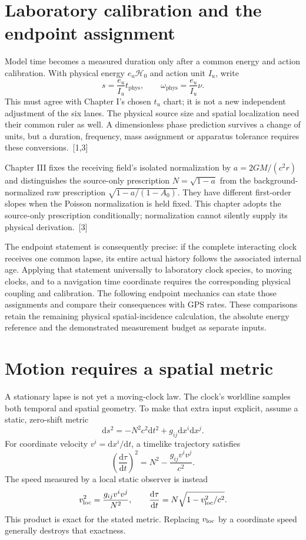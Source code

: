 \documentclass[10pt,twocolumn,letterpaper]{article}
\newcommand{\dd}{\mathrm{d}}
\begin{document}









\section{Laboratory calibration and the endpoint assignment}
Model time becomes a measured duration only after a common energy and action calibration. With physical energy $e_u\mathcal H_0$ and action unit $I_u$, write
\[
 s=\frac{e_u}{I_u}t_{\mathrm{phys}},\qquad
 \omega_{\mathrm{phys}}=\frac{e_u}{I_u}\nu.
\]
This must agree with Chapter I's chosen $t_u$ chart; it is not a new independent adjustment of the six lanes. The physical source size and spatial localization need their common ruler as well. A dimensionless phase prediction survives a change of units, but a duration, frequency, mass assignment or apparatus tolerance requires these conversions.~[1,3]

Chapter III fixes the receiving field's isolated normalization by $a=2GM/(c^2r)$ and distinguishes the source-only prescription $N=\sqrt{1-a}$ from the background-normalized raw prescription $\sqrt{1-a/(1-A_0)}$. They have different first-order slopes when the Poisson normalization is held fixed. This chapter adopts the source-only prescription conditionally; normalization cannot silently supply its physical derivation.~[3]

The endpoint statement is consequently precise: if the complete interacting clock receives one common lapse, its entire actual history follows the associated internal age. Applying that statement universally to laboratory clock species, to moving clocks, and to a navigation time coordinate requires the corresponding physical coupling and calibration. The following endpoint mechanics can state those assignments and compare their consequences with GPS rates. These comparisons retain the remaining physical spatial-incidence calculation, the absolute energy reference and the demonstrated measurement budget as separate inputs.


\section{Motion requires a spatial metric}
A stationary lapse is not yet a moving-clock law. The clock's worldline samples both temporal and spatial geometry. To make that extra input explicit, assume a static, zero-shift metric
\[
 \dd s^2=-N^2c^2\dd t^2+g_{ij}\dd x^i\dd x^j.
\]
For coordinate velocity $v^i=\dd x^i/\dd t$, a timelike trajectory satisfies
\[
 \left(\frac{\dd\tau}{\dd t}\right)^2
 =N^2-\frac{g_{ij}v^iv^j}{c^2}.
\]
The speed measured by a local static observer is instead
\[
 v_{\rm loc}^2=\frac{g_{ij}v^iv^j}{N^2},\qquad
 \frac{\dd\tau}{\dd t}=N\sqrt{1-v_{\rm loc}^2/c^2}.
\]
This product is exact for the stated metric. Replacing $v_{\rm loc}$ by a coordinate speed generally destroys that exactness.
\end{document}

